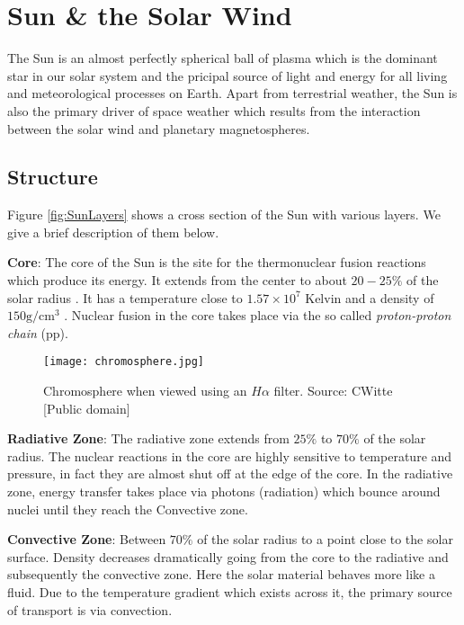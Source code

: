 \section{Sun \& the Solar Wind}\label{sec:solar}

The Sun is an almost perfectly spherical ball of plasma which is the dominant star in our solar system and 
the pricipal source of light and energy for all living and meteorological processes on Earth. Apart from 
terrestrial weather, the Sun is also the primary driver of space weather which results from the interaction 
between the solar wind and planetary magnetospheres.

\subsection{Structure}

Figure \ref{fig:SunLayers} shows a cross section of the Sun with various layers. We give a brief description 
of them below.

\textbf{Core}: The core of the Sun is the site for the thermonuclear fusion reactions which produce its energy. It extends 
from the center to about $20-25\%$ of the solar radius \citep{SolarAct}. It has a temperature close to 
$1.57 \times 10^7$ Kelvin and a density of $150 \text{g}/\text{cm}^3$ \citep{SolarCore}. Nuclear fusion in the core 
takes place via the so called \emph{proton-proton chain} (pp).

\begin{wrapfigure}{r}{0.4\textwidth}
    \centering\texttt{[image: chromosphere.jpg]}
    \caption{
        \small Chromosphere when viewed using an $H\alpha$ filter. Source: CWitte [Public domain]}
    \label{fig:chromosphere}
\end{wrapfigure}

\textbf{Radiative Zone}: The radiative zone extends from $25\%$ to $70\%$ of the solar radius. The nuclear reactions 
in the core are highly sensitive to temperature and pressure, in fact they are almost shut off at the edge of the core. 
In the radiative zone, energy transfer takes place via photons (radiation) which bounce around nuclei until 
they reach the Convective zone.

\textbf{Convective Zone}: Between $70\%$ of the solar radius to a point close to the solar surface. Density decreases 
dramatically going from the core to the radiative and subsequently the convective zone. Here the solar material behaves more 
like a fluid. Due to the temperature gradient which exists across it, the primary source of transport is 
via convection.


